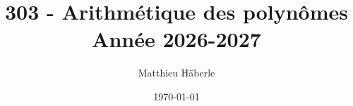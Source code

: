 \documentclass[a4paper, 12pt]{report}
\title{
	{\Huge 303 - Arithmétique des polynômes \\ }
	{\huge Année 2026-2027}
}
\author{\Large{Matthieu Häberle}}
\date{\today}
\begin{document}
\maketitle
\newpage
\twocolstableofcontents
\pagebreak












\end{document}
